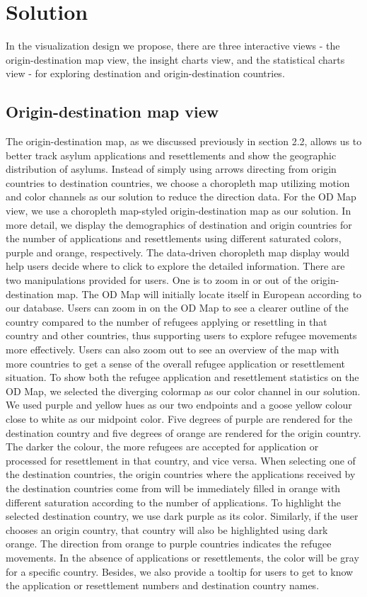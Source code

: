 \documentclass[journal]{vgtc}                %
\begin{document}
 \section{Solution}

 In the visualization design we propose, there are three interactive views - the origin-destination map view, the insight charts view, and the statistical charts view - for exploring destination and origin-destination countries.
 
 \subsection{Origin-destination map view}
 The origin-destination map, as we discussed previously in section 2.2, allows us to better track asylum applications and resettlements and show the geographic distribution of asylums. Instead of simply using arrows directing from origin countries to destination countries, we choose a choropleth map utilizing motion and color channels as our solution to reduce the direction data.
 For the OD Map view, we use a choropleth map-styled origin-destination map as our solution. In more detail, we display the demographics of destination and origin countries for the number of applications and resettlements using different saturated colors, purple and orange, respectively. The data-driven choropleth map display would help users decide where to click to explore the detailed information.
 There are two manipulations provided for users. One is to zoom in or out of the origin-destination map. The OD Map will initially locate itself in European according to our database. Users can zoom in on the OD Map to see a clearer outline of the country compared to the number of refugees applying or resettling in that country and other countries, thus supporting users to explore refugee movements more effectively. Users can also zoom out to see an overview of the map with more countries to get a sense of the overall refugee application or resettlement situation.
 To show both the refugee application and resettlement statistics on the OD Map, we selected the diverging colormap as our color channel in our solution. We used purple and yellow hues as our two endpoints and a goose yellow colour close to white as our midpoint color. Five degrees of purple are rendered for the destination country and five degrees of orange are rendered for the origin country. The darker the colour, the more refugees are accepted for application or processed for resettlement in that country, and vice versa. When selecting one of the destination countries, the origin countries where the applications received by the destination countries come from will be immediately filled in orange with different saturation according to the number of applications.
 To highlight the selected destination country, we use dark purple as its color. Similarly, if the user chooses an origin country, that country will also be highlighted using dark orange. The direction from orange to purple countries indicates the refugee movements. In the absence of applications or resettlements, the color will be gray for a specific country. Besides, we also provide a tooltip for users to get to know the application or resettlement numbers and destination country names.
\end{document}
